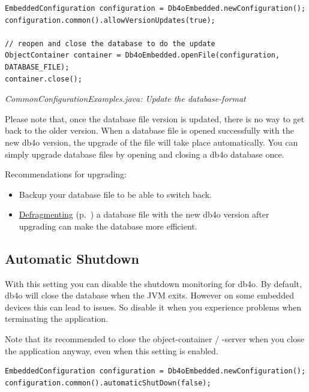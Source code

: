 \begin{lstlisting}
EmbeddedConfiguration configuration = Db4oEmbedded.newConfiguration();
configuration.common().allowVersionUpdates(true);

// reopen and close the database to do the update
ObjectContainer container = Db4oEmbedded.openFile(configuration, DATABASE_FILE);
container.close();
\end{lstlisting}

{\small\itshape CommonConfigurationExamples.java: Update the database-format\par}
\medskip

Please note that, once the database file version is updated, there is no way to get back to the older version. When a database file is opened successfully with the new db4o version, the upgrade of the file will take place automatically. You can simply upgrade database files by opening and closing a db4o database once.

Recommendations for upgrading:

\begin{itemize}
\item Backup your database file to be able to switch back.
\item \hyperref[ref:advanced-topics-defragment]{Defragmenting} (p.~\pageref{ref:advanced-topics-defragment}) a database file with the new db4o version after upgrading can make the database more efficient.
\end{itemize}

\subsection{Automatic Shutdown}
\label{ref:configuration-common-automatic-shutdown}

With this setting you can disable the shutdown monitoring for db4o. By default, db4o will close the database when the JVM exits. However on some embedded devices this can lead to issues. So disable it when you experience problems when terminating the application.

Note that its recommended to close the object-container / -server when you close the application anyway, even when this setting is enabled.

\begin{lstlisting}
EmbeddedConfiguration configuration = Db4oEmbedded.newConfiguration();
configuration.common().automaticShutDown(false);
\end{lstlisting}

